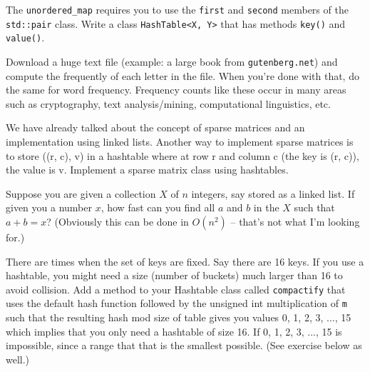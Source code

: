 \begin{ex}
  The \verb!unordered_map! requires you to use the
  \verb!first! and \verb!second! members of the
  \verb!std::pair! class.
  Write a class \verb!HashTable<X, Y>! that has
  methods \verb!key()! and \verb!value()!.
\end{ex}


\begin{ex}
Download a huge text file (example: a large book from \verb!gutenberg.net!)
and compute the frequently of each letter in the file.
When you're done with that, do the same for word frequency.
Frequency counts like these occur in many areas such as
cryptography, text analysis/mining, computational linguistics, etc.
\end{ex}


\begin{ex}
We have already talked about the concept of sparse matrices and
an implementation using linked lists.
Another way to implement sparse matrices is to store
((r, c), v) in a hashtable
where at row r and column c (the key is (r, c)), the value is v.
Implement a sparse matrix class using hashtables.
\end{ex}


\begin{ex}
  Suppose you are given a collection $X$ of $n$
  integers, say stored as a linked
  list.
  If given you a number $x$, how fast can you find all $a$ and $b$ in the $X$
  such that $a + b = x$?
  (Obviously this can be done in $O(n^2)$ -- that's not what I'm looking for.)
\end{ex}


\begin{ex} 
  There are times when the set of keys are fixed.
  Say there are 16 keys.
  If you use a hashtable, you might need a size (number of buckets)
  much larger than 16 to avoid collision.
  Add a method to your Hashtable class called \verb!compactify!
  that uses the default hash function followed by the unsigned int
  multiplication of \verb!m! such that
  the resulting hash mod size of table gives you
  values 0, 1, 2, 3, ..., 15 which implies that
  you only need a hashtable of size 16.
  If 0, 1, 2, 3, ..., 15 is impossible, since a range that that is the
  smallest possible.
  (See exercise below as well.)
\end{ex}


